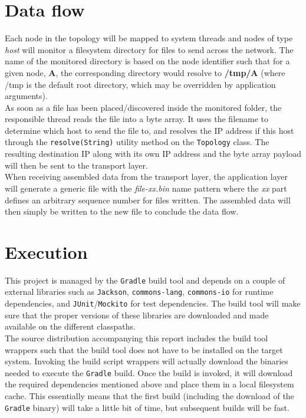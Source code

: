 \documentclass{scrartcl}
\begin{document}
\section{Data flow}
Each node in the topology will be mapped to system threads and nodes of type \textit{host} will monitor a filesystem directory for files to send across the network. The name of the monitored directory is based on the node identifier such that for a given node, \textbf{A}, the corresponding directory would resolve to \textbf{/tmp/A} (where /tmp is the default root directory, which may be overridden by application arguments). \\

As soon as a file has been placed/discovered inside the monitored folder, the responsible thread reads the file into a byte array. It uses the filename to determine which host to send the file to, and resolves the IP address if this host through the \texttt{resolve(String)} utility method on the \texttt{Topology} class. The resulting destination IP along with its own IP address and the byte array payload will then be sent to the transport layer. \\

When receiving assembled data from the transport layer, the application layer will generate a generic file with the \textit{file-xx.bin} name pattern where the \textit{xx} part defines an arbitrary sequence number for files written. The assembled data will then simply be written to the new file to conclude the data flow.

\newpage
\section{Execution}
This project is managed by the \texttt{Gradle} build tool and depends on a couple of external libraries such as \texttt{Jackson}, \texttt{commons-lang}, \texttt{commons-io} for runtime dependencies, and \texttt{JUnit}/\texttt{Mockito} for test dependencies. The build tool will make sure that the proper versions of these libraries are downloaded and made available on the different classpaths. \\

The source distribution accompanying this report includes the build tool wrappers such that the build tool does not have to be installed on the target system. Invoking the build script wrappers will actually download the binaries needed to execute the \texttt{Gradle} build. Once the build is invoked, it will download the required dependencies mentioned above and place them in a local filesystem cache. This essentially means that the first build (including the download of the \texttt{Gradle} binary) will take a little bit of time, but subsequent builds will be fast. \\
\end{document}
